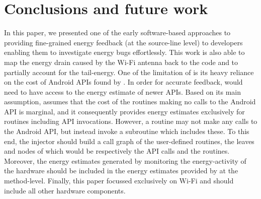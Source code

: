 \section{Conclusions and future work}
\label{sec:conc}

In this paper, we presented one of the early software-based approaches 
to providing fine-grained energy feedback (at the source-line level) to 
developers enabling them to investigate energy bugs effortlessly. This 
work is also able to map the energy drain caused by the Wi-Fi antenna 
back to the code and to partially account for the tail-energy. One of 
the limitation of \orka{} is its heavy reliance on the cost of Android 
APIs found by \cite{linares2014mining}. In order for accurate feedback, 
\orka{} would need to have access to the energy estimate of newer APIs. 
Based on its main assumption, \orka{} assumes that the cost of the 
routines making no calls to the Android API is marginal, and it 
consequently provides energy estimates exclusively for routines 
including API invocations. However, a routine may not make any calls to 
the Android API, but instead invoke a subroutine which includes these. 
To this end, the injector should build a call graph of the user-defined 
routines, the leaves and nodes of which would be respectively the API 
calls and the routines.  Moreover, the energy estimates generated by 
monitoring the energy-activity of the hardware should be included in the 
energy estimates provided by \orka{} at the method-level. Finally, this 
paper focussed exclusively on Wi-Fi and should include all other 
hardware components.

